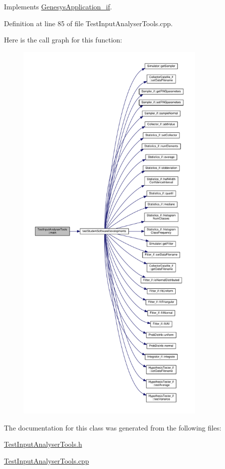 Implements \hyperlink{class_genesys_application__if_a2b07e7803b410a4a8d0f87422dabb004}{Genesys\-Application\-\_\-if}.



Definition at line 85 of file Test\-Input\-Analyser\-Tools.\-cpp.



Here is the call graph for this function\-:
\nopagebreak
\begin{figure}[H]
\begin{center}
\leavevmode
\includegraphics[height=550pt]{class_test_input_analyser_tools_a8015a3024f29bddc865cb0b419214cd7_cgraph}
\end{center}
\end{figure}




The documentation for this class was generated from the following files\-:\begin{DoxyCompactItemize}
\item 
\hyperlink{_test_input_analyser_tools_8h}{Test\-Input\-Analyser\-Tools.\-h}\item 
\hyperlink{_test_input_analyser_tools_8cpp}{Test\-Input\-Analyser\-Tools.\-cpp}\end{DoxyCompactItemize}
